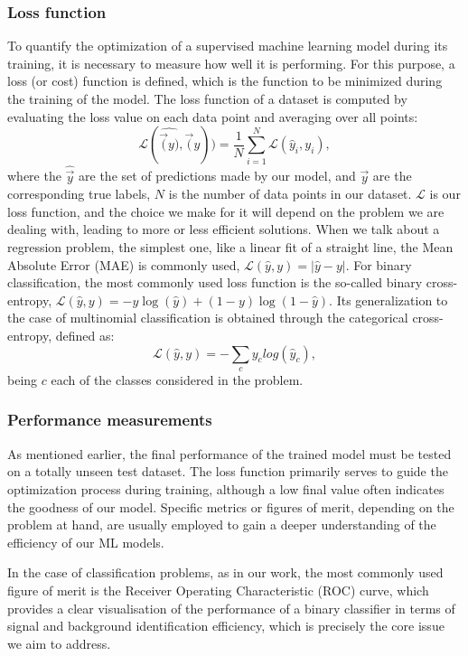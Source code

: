 \subsubsection*{Loss function}
To quantify the optimization of a supervised machine learning model during its training, it is necessary to measure how well it is performing. For this purpose, a loss (or cost) function is defined, which is the function to be minimized during the training of the model.  
The loss function of a dataset is computed by evaluating the loss value on each data point and averaging over all points:
\begin{equation}
    \mathcal{L}(\hat{\vec(y)},\vec(y)) = \frac{1}{N}\sum^{N}_{i=1} \mathcal{L}(\hat{y}_{i},y_{i}),
\end{equation}
where the $\hat{\vec{y}}$ are the set of predictions made by our model, and ${\vec{y}}$ are the corresponding true labels, $N$ is the number of data points in our dataset. $\mathcal{L}$ is our loss function, and the choice we make for it will depend on the problem we are dealing with, leading to more or less efficient solutions.
When we talk about a regression problem, the simplest one, like a linear fit of a straight line, the Mean Absolute Error (MAE) is commonly used, $\mathcal{L}(\hat{y},y) = |\hat{y} - y|$.
For binary classification, the most commonly used loss function is the so-called binary cross-entropy, $\mathcal{L}(\hat{y},y) = -y\log(\hat{y}) + (1-y)\log(1-\hat{y})$.
Its generalization to the case of multinomial classification is obtained through the categorical cross-entropy, defined as:
\begin{equation}
    \mathcal{L}(\hat{y},y) = - \sum_{c} y_{c} log(\hat{y}_{c}),
\end{equation}
being $c$ each of the classes considered in the problem.

\subsubsection*{Performance measurements}

As mentioned earlier, the final performance of the trained model must be tested on a totally unseen test dataset. The loss function primarily serves to guide the optimization process during training, although a low final value often indicates the goodness of our model. Specific metrics or figures of merit, depending on the problem at hand, are usually employed to gain a deeper understanding of the efficiency of our ML models.

In the case of classification problems, as in our work, the most commonly used figure of merit is the Receiver Operating Characteristic (ROC) curve, which provides a clear visualisation of the performance of a binary classifier in terms of signal and background identification efficiency, which is precisely the core issue we aim to address.

